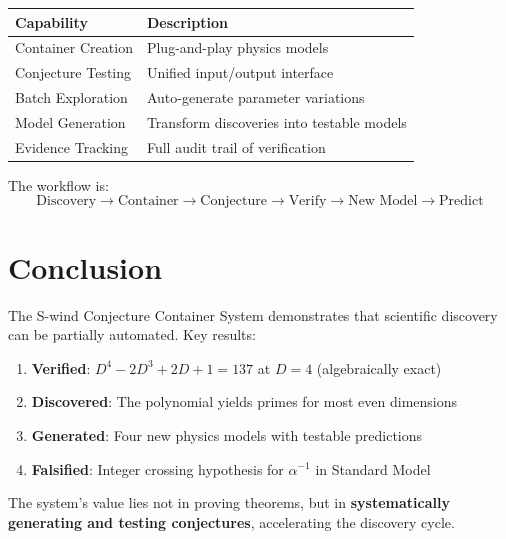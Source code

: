 \documentclass[11pt,a4paper]{article}
\begin{document}
\begin{center}
\begin{tabular}{|l|l|}
\hline
Capability & Description \\
\hline
Container Creation & Plug-and-play physics models \\
Conjecture Testing & Unified input/output interface \\
Batch Exploration & Auto-generate parameter variations \\
Model Generation & Transform discoveries into testable models \\
Evidence Tracking & Full audit trail of verification \\
\hline
\end{tabular}
\end{center}

The workflow is:
\begin{equation}
\text{Discovery} \to \text{Container} \to \text{Conjecture} \to \text{Verify} \to \text{New Model} \to \text{Predict}
\end{equation}

\section{Conclusion}

The S-wind Conjecture Container System demonstrates that scientific discovery can be partially automated. Key results:

\begin{enumerate}
    \item \textbf{Verified}: $D^4 - 2D^3 + 2D + 1 = 137$ at $D = 4$ (algebraically exact)
    
    \item \textbf{Discovered}: The polynomial yields primes for most even dimensions
    
    \item \textbf{Generated}: Four new physics models with testable predictions
    
    \item \textbf{Falsified}: Integer crossing hypothesis for $\alpha^{-1}$ in Standard Model
\end{enumerate}

The system's value lies not in proving theorems, but in \textbf{systematically generating and testing conjectures}, accelerating the discovery cycle.
\end{document}
